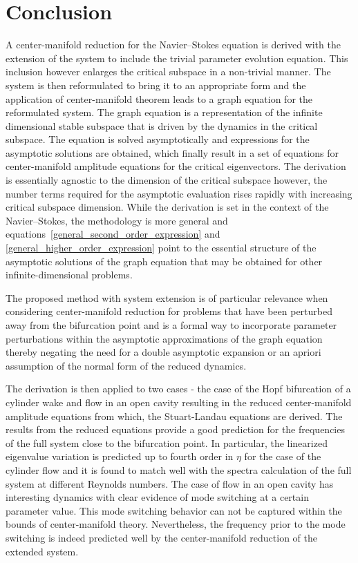 \section{Conclusion}
\label{conclusion}
A center-manifold reduction for the Navier--Stokes equation is derived with the extension of the system to include the trivial parameter evolution equation. This inclusion however enlarges the critical subspace in a non-trivial manner. The system is then reformulated to bring it to an appropriate form and the application of center-manifold theorem leads to a graph equation for the reformulated system. The graph equation is a representation of the infinite dimensional stable subspace that is driven by the dynamics in the critical subspace. The equation is solved asymptotically and expressions for the asymptotic solutions are obtained, which finally result in a set of equations for center-manifold amplitude equations for the critical eigenvectors. The derivation is essentially agnostic to the dimension of the critical subspace however, the number terms required for the asymptotic evaluation rises rapidly with increasing critical subspace dimension. While the derivation is set in the context of the Navier--Stokes, the methodology is more general and equations~\eqref{general_second_order_expression} and \eqref{general_higher_order_expression} point to the essential structure of the asymptotic solutions of the graph equation that may be obtained for other infinite-dimensional problems. 

The proposed method with system extension is of particular relevance when considering center-manifold reduction for problems that have been perturbed away from the bifurcation point and is a formal way to incorporate parameter perturbations within the asymptotic approximations of the graph equation thereby negating the need for a double asymptotic expansion or an apriori assumption of the normal form of the reduced dynamics.

The derivation is then applied to two cases - the case of the Hopf bifurcation of a cylinder wake and flow in an open cavity resulting in the reduced center-manifold amplitude equations from which, the Stuart-Landau equations are derived. The results from the reduced equations provide a good prediction for the frequencies of the full system close to the bifurcation point. In particular, the linearized eigenvalue variation is predicted up to fourth order in $\eta$ for the case of the cylinder flow and it is found to match well with the spectra calculation of the full system at different Reynolds numbers. The case of flow in an open cavity has interesting dynamics with clear evidence of mode switching at a certain parameter value. This mode switching behavior can not be captured within the bounds of center-manifold theory. Nevertheless, the frequency prior to the mode switching is indeed predicted well by the center-manifold reduction of the extended system.

\FloatBarrier


